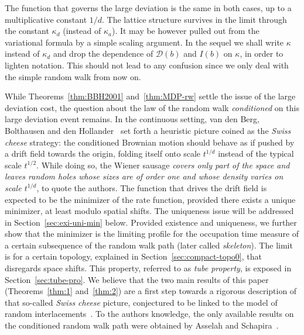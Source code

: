 \documentclass[a4paper,11pt]{amsart}
\numberwithin{equation}{section}
\newcommand{\cD}{{\ensuremath{\mathcal D}} }
\newcommand{\gk}{\kappa}
\newcommand{\8}{\infty}
\begin{document}
The function that governs the large deviation is the same in both cases, up to a multiplicative constant $1/d$. The lattice structure survives in the limit through the constant $\gk_d$ (instead of $\gk_a$). It may be however pulled out from the variational formula by a simple scaling argument. In the sequel we shall write $\gk$ instead of $\gk_d$ and drop the dependence of $\cD(b)$ and $I(b)$ on $\kappa$, in order to lighten notation. This should not lead to any confusion since we only deal with the simple random walk from now on.

\par While Theorems~\ref{thm:BBH2001} and~\ref{thm:MDP-rw} settle the issue of the large deviation cost, the question about the law of the random walk {\it conditioned} on this large deviation event remains. In the continuous setting, van den Berg, Bolthausen and den Hollander~\cite{BBH2001} set forth a heuristic picture coined as the {\it Swiss cheese} strategy: the conditioned Brownian motion should behave as if pushed by a drift field towards the origin, folding itself onto scale $t^{1/d}$ instead of the typical scale $t^{1/2}$. While doing so, the Wiener sausage \emph{covers only part of the space and leaves random holes whose sizes are of order one and whose density varies on scale $t^{1/d}$}, to quote the authors. The function that drives the drift field is expected to be the minimizer of the rate function, provided there exists a unique minimizer, at least modulo spatial shifts. The uniqueness issue will be addressed in Section~\ref{sec:exi-uni-min} below. Provided existence and uniqueness, we further show that the minimizer is the limiting profile for the occupation time measure of a certain subsequence of the random walk path (later called {\it skeleton}). The limit is for a certain topology, explained in Section~\ref{sec:compact-topo0}, that disregards space shifts. This property, referred to as {\it tube property}, is exposed in Section~\ref{sec:tube-pro}. We believe that the two main results of this paper (Theorems~\ref{thm:1} and~\ref{thm:2}) are a first step towards a rigorous description of that so-called {\it Swiss cheese} picture, conjectured to be linked to the model of random interlacements~\cite{sznitman2021bulk}. To the authors knowledge, the only available results on the conditioned random walk path were obtained by Asselah and Schapira~\cite{AssSch17,Asselah:2018aa, MR4265025}.

%
\end{document}
